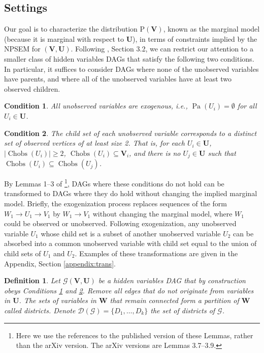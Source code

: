 \documentclass[12pt]{article}
\newtheorem{definition}{Definition}
\newtheorem{condition}{Condition}
\def\Pr{{\mathrm{P}}}
\DeclareMathOperator{\Chobs}{Chobs}
\newcommand{\bW}{\boldsymbol{W}}
\newcommand{\bU}{\boldsymbol{U}}
\newcommand{\bV}{\boldsymbol{V}}
\DeclareMathOperator{\Pa}{Pa}
\begin{document}
\subsection{Settings}
Our goal is to characterize the distribution $\Pr(\bV)$, known as the marginal model (because it is marginal with respect to $\bU$), in terms of constraints implied by the NPSEM for $(\bV,\bU)$. Following \citet{evans2016graphs}, Section 3.2, we can restrict our attention to a smaller class of hidden variables DAGs that satisfy the following two conditions. In particular, it suffices to consider DAGs where none of the unobserved variables have parents, and where all of the unobserved variables have at least two observed children. 

\begin{condition} \label{A1}
All unobserved variables are exogenous, i.e., $\Pa(U_i) = \emptyset$ for all $U_i \in \bU$.
\end{condition}

\begin{condition} \label{A2}
The child set of each unobserved variable corresponds to a distinct
set of observed vertices of at least size 2. That is, for each $U_i \in \bU$, $|\Chobs(U_i)| \geq 2$, $\Chobs(U_i) \subseteq \bV_i$, and there is no $U_j \in \bU$ such that $\Chobs(U_i) \subseteq \Chobs(U_j)$.
\end{condition}

By Lemmas 1--3 of \citet{evans2016graphs}\footnote{Here we use the references to the published version of these Lemmas, rather than the arXiv version. The arXiv versions are Lemmas 3.7--3.9.}, DAGs where these conditions do not hold can be transformed to DAGs where they do hold without changing the implied marginal model. Briefly, the exogenization process replaces sequences of the form $W_1 \rightarrow U_1 \rightarrow V_1$ by $W_1 \rightarrow V_1$ without changing the marginal model, where $W_1$ could be observed or unobserved. Following exogenization, any unobserved variable $U_1$ whose child set is a subset of another unobserved variable $U_2$ can be absorbed into a common unobserved variable with child set equal to the union of child sets of $U_1$ and $U_2$. Examples of these transformations are given in the Appendix, Section \ref{appendix:trans}.



\begin{definition} \label{def:districts}
Let $\mathcal{G}(\bV, \bU)$ be a hidden variables DAG that by construction obeys Conditions \ref{A1} and \ref{A2}. Remove all edges that do not originate from variables in $\bU$. The sets of variables in $\bW$ that remain connected form a partition of $\bW$ called \emph{districts}. Denote $\mathcal{D}(\mathcal{G}) = \{D_1, \ldots, D_k\}$ the set of districts of $\mathcal{G}$. 
\end{definition}
\end{document}
